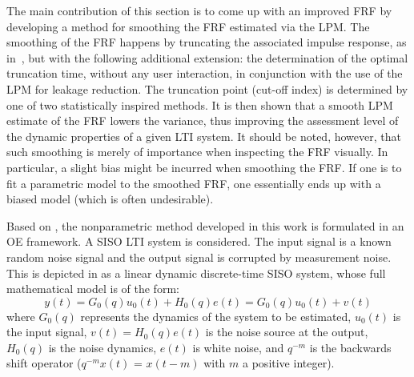 \label{sec:nonparametric:truncation}


The main contribution of this section is to come up with an improved \gls{FRF} by developing a method for smoothing the \gls{FRF} estimated via the \gls{LPM}. 
The smoothing of the \gls{FRF} happens by truncating the associated impulse response, as in~\citet{Schoukens1998}, but with the following additional extension: the determination of the optimal truncation time, without any user interaction, in conjunction with the use of the \gls{LPM} for leakage reduction. 
The truncation point (cut-off index) is determined by one of two statistically inspired methods.
It is then shown that a smooth \gls{LPM} estimate of the \gls{FRF} lowers the variance, thus improving the assessment level of the dynamic properties of a given \gls{LTI} system.
It should be noted, however, that such smoothing is merely of importance when inspecting the \gls{FRF} visually.
In particular, a slight bias might be incurred when smoothing the \gls{FRF}.
If one is to fit a parametric model to the smoothed \gls{FRF}, one essentially ends up with a biased model (which is often undesirable).

Based on \citet{Schoukens2009LPM}, the nonparametric method developed in this work is formulated in an \gls{OE} framework. 
A \gls{SISO} \gls{LTI} system is considered.
The input signal is a known random noise signal and the output signal is corrupted by measurement noise. This is depicted in  as a linear dynamic discrete-time \gls{SISO} system, whose full mathematical model is of the form:
\begin{equation}\label{eq:nparam:trunc:LPM:TD}
y(t)=G_0(q)u_0(t)+H_0(q)e(t)=G_0(q)u_0(t)+v(t)
\end{equation}
where $G_0(q)$ represents the dynamics of the system to be estimated, $u_0(t)$ is the input signal, $v(t)= H_0(q)e(t)$ is the noise source at the output, $H_0(q)$ is the noise dynamics, $e(t)$ is white noise, and $q^{-m}$ is the backwards shift operator ($q^{-m}x(t)$ = $x(t-m)$  with $m$ a positive integer).

